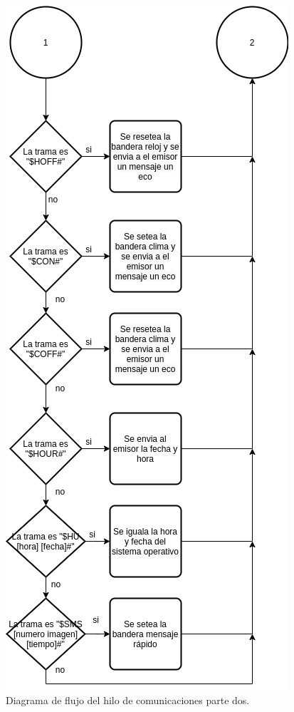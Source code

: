 \begin{figure}[htpb]
	\centering
	\includegraphics[scale=0.6]{Figures/hilo2parte2.jpg} 
	\caption{Diagrama de flujo del hilo de comunicaciones parte dos.}
	\label{fig: hilocomparte2}
\end{figure}


